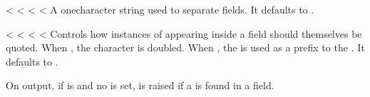 \documentclass[letterpaper,10pt,english]{sphinxmanual}
\begin{document}
\vspace{5px}

\begin{fulllineitems}
\label{\detokenize{csv:csv.Dialect.delimiter}}<%
\pysigstartsignatures
<%
<%
<%
A one\sphinxhyphen{}character string used to separate fields.  It defaults to \sphinxcode{\sphinxupquote{\textquotesingle{},\textquotesingle{}}}.

\end{fulllineitems}


\vspace{5px}

\begin{fulllineitems}
\label{\detokenize{csv:csv.Dialect.doublequote}}<%
\pysigstartsignatures
<%
<%
<%
Controls how instances of  appearing inside a field should
themselves be quoted.  When , the character is doubled. When
, the  is used as a prefix to the .  It
defaults to .

On output, if  is  and no  is set,
{\hyperref[\detokenize{csv:csv.Error}]{}} is raised if a  is found in a field.

\end{fulllineitems}


\vspace{5px}
\end{document}
